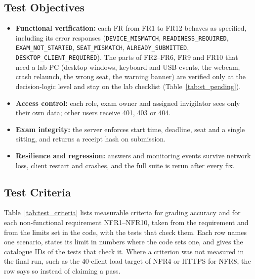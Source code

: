 \subsection{Test Objectives}
\begin{itemize}[nosep]
  \item \textbf{Functional verification:} each FR from FR1 to FR12 behaves as specified, including its error responses (\texttt{DEVICE\_\allowbreak{}MISMATCH}, \texttt{READINESS\_\allowbreak{}REQUIRED}, \texttt{EXAM\_\allowbreak{}NOT\_\allowbreak{}STARTED}, \texttt{SEAT\_\allowbreak{}MISMATCH}, \texttt{ALREADY\_\allowbreak{}SUBMITTED}, \texttt{DESKTOP\_\allowbreak{}CLIENT\_\allowbreak{}REQUIRED}). The parts of FR2--FR6, FR9 and FR10 that need a lab PC (desktop windows, keyboard and USB events, the webcam, crash relaunch, the wrong seat, the warning banner) are verified only at the decision-logic level and stay on the lab checklist (Table~\ref{tab:st_pending}).
  \item \textbf{Access control:} each role, exam owner and assigned invigilator sees only their own data; other users receive 401, 403 or 404.
  \item \textbf{Exam integrity:} the server enforces start time, deadline, seat and a single sitting, and returns a receipt hash on submission.
  \item \textbf{Resilience and regression:} answers and monitoring events survive network loss, client restart and crashes, and the full suite is rerun after every fix.
\end{itemize}

\subsection{Test Criteria}
Table~\ref{tab:test_criteria} lists measurable criteria for grading accuracy and for each non-functional requirement NFR1--NFR10, taken from the requirement and from the limits set in the code, with the tests that check them. Each row names one scenario, states its limit in numbers where the code sets one, and gives the catalogue IDs of the tests that check it. Where a criterion was not measured in the final run, such as the 40-client load target of NFR4 or HTTPS for NFR8, the row says so instead of claiming a pass.

